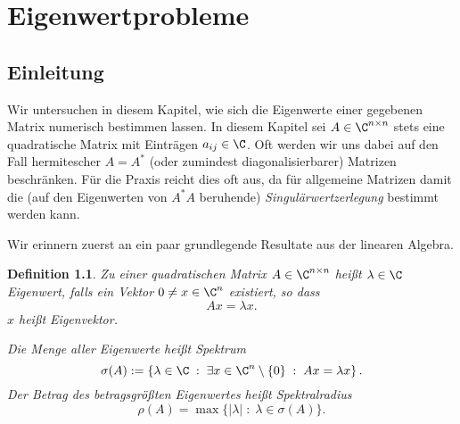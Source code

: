 \documentclass[
]{mycourse}
\theoremstyle{mythm}
\newtheorem{definition}[theorem]{Definition}
\theoremstyle{break}
\newcommand{\dd}{\; : \;}    			      	%
\begin{document}

\chapter{Eigenwertprobleme}

\section{Einleitung}

Wir untersuchen in diesem Kapitel, wie sich die Eigenwerte einer gegebenen Matrix numerisch bestimmen lassen.
In diesem Kapitel sei $A\in \C^{n\times n}$ stets eine quadratische Matrix mit Einträgen $a_{ij}\in \C$.
Oft werden wir uns dabei auf den Fall hermitescher $A=A^*$ (oder zumindest diagonalisierbarer) Matrizen beschränken. 
Für die Praxis reicht dies oft aus, da für allgemeine Matrizen damit die (auf den Eigenwerten von $A^*A$ beruhende)
\emph{Singulärwertzerlegung} bestimmt werden kann.

Wir erinnern zuerst an ein paar grundlegende Resultate aus der linearen Algebra.

\begin{definition}
Zu einer quadratischen Matrix $A\in \C^{n\times n}$ heißt $\lambda\in \C$ \emph{Eigenwert}, falls ein Vektor
$0\neq x\in \C^n$ existiert, so dass
\[
Ax=\lambda x.
\]
$x$ heißt \emph{Eigenvektor}. 

Die Menge aller Eigenwerte heißt \emph{Spektrum}
\[
\sigma(A):=\left\{ \lambda\in \C \dd \exists x\in \C^n\setminus\{0\} \dd Ax=\lambda x \right\}.
\]
Der Betrag des betragsgrößten Eigenwertes heißt \emph{Spektralradius}
\[
\rho(A)=\max\{|\lambda|\dd \lambda\in \sigma(A)\}.
\]
\end{definition}
\end{document}
